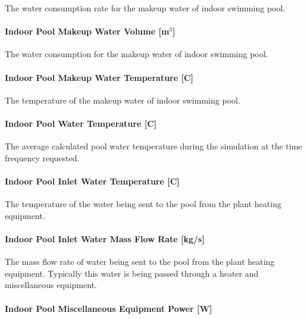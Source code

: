The water consumption rate for the makeup water of indoor swimming pool.

\paragraph{Indoor Pool Makeup Water Volume {[}m\(^{3}\){]}}\label{indoor-pool-makeup-water-volume-m3}

The water consumption for the makeup water of indoor swimming pool.

\paragraph{Indoor Pool Makeup Water Temperature {[}C{]}}\label{indoor-pool-makeup-water-temperature-c}

The temperature of the makeup water of indoor swimming pool.

\paragraph{Indoor Pool Water Temperature {[}C{]}}\label{indoor-pool-water-temperature-c}

The average calculated pool water temperature during the simulation at the time frequency requested.

\paragraph{Indoor Pool Inlet Water Temperature {[}C{]}}\label{indoor-pool-inlet-water-temperature-c}

The temperature of the water being sent to the pool from the plant heating equipment.

\paragraph{Indoor Pool Inlet Water Mass Flow Rate {[}kg/s{]}}\label{indoor-pool-inlet-water-mass-flow-rate-kgs}

The mass flow rate of water being sent to the pool from the plant heating equipment. Typically this water is being passed through a heater and miscellaneous equipment.

\paragraph{Indoor Pool Miscellaneous Equipment Power {[}W{]}}\label{indoor-pool-miscellaneous-equipment-power-w}

